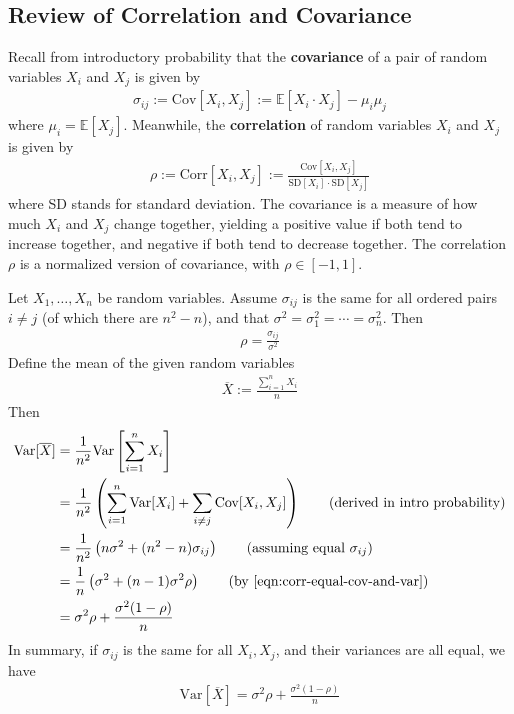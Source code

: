 \documentclass[12pt, a4paper]{article}
\theoremstyle{definition}
\begin{document}
	\subsection*{Review of Correlation and Covariance}
	Recall from introductory probability that the \textbf{covariance}
	of a pair of random variables $X_i$ and $X_j$ is given by
	\begin{align*}
		\sigma_{ij} := \text{Cov}[X_i,X_j] := \mathbb{E}[X_i\cdot X_j] - \mu_i\mu_j
	\end{align*}
	where $\mu_i = \mathbb{E}[X_j]$.
	Meanwhile, the \textbf{correlation} of random variables $X_i$ and $X_j$
	is given by
	\begin{align*}
		\rho := \text{Corr}[X_i,X_j] := \frac{\text{Cov}[X_i,X_j]}{\text{SD}[X_i]\cdot \text{SD}[X_j]}
	\end{align*}
	where SD stands for standard deviation.
	The covariance is a measure of how much $X_i$ and $X_j$ change together,
	yielding a positive value if both tend to increase together, and negative
	if both tend to decrease together. The correlation $\rho$ is a normalized
	version of covariance, with $\rho\in [-1, 1]$.
	
	Let $X_1,\ldots,X_n$ be random variables. Assume $\sigma_{ij}$ is the same for all
	ordered pairs $i\neq j$ (of which there are $n^2 - n$), and that
	$\sigma^2 = \sigma_1^2 = \cdots = \sigma_n^2$. Then
	\begin{align}
		\rho = \frac{\sigma_{ij}}{\sigma^2}
		\label{eqn:corr-equal-cov-and-var}
	\end{align}
	Define the mean of the given random variables
	\begin{align*}
		\overline{X} := \frac{\sum_{i=1}^{n}X_i}{n}
	\end{align*}
	Then
	\begin{align*}
		\text{Var}[\overline{X}]
		&= \frac{1}{n^2}\text{Var}\left[\sum_{i=1}^{n}X_i\right]\\
		&= \frac{1}{n^2}\left(
		\sum_{i=1}^{n}\text{Var}[X_i] + \sum_{i\neq j}\text{Cov}[X_i,X_j]
		\right)\tag{derived in intro probability}\\
		&= \frac{1}{n^2}\left(
		n\sigma^2 + (n^2-n)\sigma_{ij}
		\right)\tag{assuming equal $\sigma_{ij}$}\\
		&= \frac{1}{n}\left(
		\sigma^2 + (n - 1)\sigma^2 \rho
		\right)
		\tag{by \ref{eqn:corr-equal-cov-and-var}}\\
		&=\sigma^2\rho + \frac{\sigma^2(1-\rho)}{n}
	\end{align*}
	In summary, if $\sigma_{ij}$ is the same for all $X_i, X_j$,
	and their variances are all equal, we have
	\begin{align}
		\text{Var}[\overline{X}] = \sigma^2\rho + \frac{\sigma^2 (1-\rho)}{n}
		\label{eqn:variance-Xbar}
	\end{align}
\end{document}
